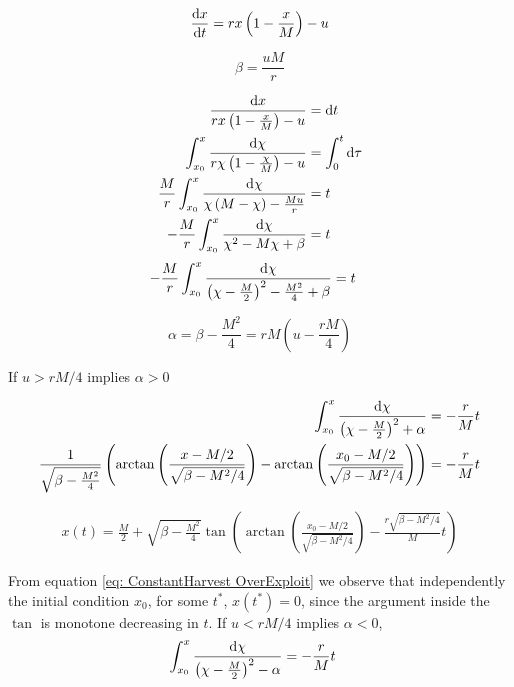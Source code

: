 \begin{equation}
\frac{\mathrm{d} x}{{\mathrm{d} t}}=rx\left(1-\frac{x}{M}\right)-u \label{eq: ConstantHarvest}
\end{equation}

\begin{equation}
\beta=\frac{uM}{r}
\end{equation}

\begin{align*}
	\frac{\mathrm{d} x}{rx\left(1-\frac{x}{M}\right)-u}&=\mathrm{d} t \\
	\int_{x_0}^{x}\frac{\mathrm{d} \chi}{r\chi\left(1-\frac{\chi}{M}\right)-u}&=\int_{0}^{t}\mathrm{d} \tau \\
	\frac{M}{r}\int_{x_0}^{x}\frac{\mathrm{d} \chi}{\chi\left(M-\chi\right)-\frac{Mu}{r}}&=t \\
	-\frac{M}{r}\int_{x_0}^{x}\frac{\mathrm{d} \chi}{\chi^2-M\chi+\beta}&=t 
	\end{align*}
\begin{align}
	-\frac{M}{r}\int_{x_0}^{x}\frac{\mathrm{d} \chi}{\left(\chi-\frac{M}{2}\right)^2-\frac{M^2}{4}+\beta}&=t
\end{align}


\begin{equation}
	\alpha = \beta - \frac{M^2}{4} = rM\left(u-\frac{rM}{4}\right)
\end{equation}


If $u>rM/4$ implies $\alpha>0$

\begin{align*}
\int_{x_0}^{x}\frac{\mathrm{d} \chi}{\left(\chi-\frac{M}{2}\right)^2+\alpha}&=-\frac{r}{M}t \\
\frac{1}{\sqrt{\beta-\frac{M^2}{4}}}\left(\arctan\left(\frac{x-M/2}{\sqrt{\beta-M^2/4}}\right)-\arctan\left(\frac{x_0-M/2}{\sqrt{\beta-M^2/4}}\right)\right)&=-\frac{r}{M}t \\
\end{align*}

\begin{align}
	x(t)=\frac{M}{2}+\sqrt{\beta-\frac{M^2}{4}} \tan \left(\arctan\left(\frac{x_0-M/2}{\sqrt{\beta-M^2/4}}\right)-\frac{r\sqrt{\beta-M^2/4}}{M}t\right) \label{eq: ConstantHarvest OverExploit}
\end{align}

From equation \ref{eq: ConstantHarvest OverExploit} we observe that independently the initial condition $x_0$, for some $t^*$, $x(t^*)=0$, since the argument inside the $\tan$ is monotone decreasing in $t$. 
If $u<rM/4$ implies $\alpha<0$,
\begin{align*}
	\int_{x_0}^{x}\frac{\mathrm{d} \chi}{\left(\chi-\frac{M}{2}\right)^2-\alpha} &=-\frac{r}{M}t
\end{align*}


